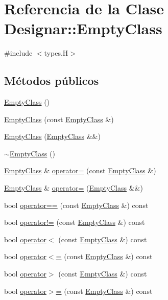 \hypertarget{class_designar_1_1_empty_class}{}\section{Referencia de la Clase Designar\+:\+:Empty\+Class}
\label{class_designar_1_1_empty_class}


{\ttfamily \#include $<$types.\+H$>$}

\subsection*{Métodos públicos}
\begin{DoxyCompactItemize}
\item 
\hyperlink{class_designar_1_1_empty_class_a88d846866a1e4872224ec2b4e750eba8}{Empty\+Class} ()
\item 
\hyperlink{class_designar_1_1_empty_class_a0a0b2cec90aebb02e6f5e3371087b221}{Empty\+Class} (const \hyperlink{class_designar_1_1_empty_class}{Empty\+Class} \&)
\item 
\hyperlink{class_designar_1_1_empty_class_aa18e6ee1ae08bc9500c9c0f91a6bae0c}{Empty\+Class} (\hyperlink{class_designar_1_1_empty_class}{Empty\+Class} \&\&)
\item 
\hyperlink{class_designar_1_1_empty_class_a751a2dca8e5df75e3f6a528f4fa43656}{$\sim$\+Empty\+Class} ()
\item 
\hyperlink{class_designar_1_1_empty_class}{Empty\+Class} \& \hyperlink{class_designar_1_1_empty_class_ac40f40d89e1823d95f5441e037d4212a}{operator=} (const \hyperlink{class_designar_1_1_empty_class}{Empty\+Class} \&)
\item 
\hyperlink{class_designar_1_1_empty_class}{Empty\+Class} \& \hyperlink{class_designar_1_1_empty_class_a41efe51c730deccac172173c27e4f9a7}{operator=} (\hyperlink{class_designar_1_1_empty_class}{Empty\+Class} \&\&)
\item 
bool \hyperlink{class_designar_1_1_empty_class_a377d66a49a2eaa853dcf5d798f82499e}{operator==} (const \hyperlink{class_designar_1_1_empty_class}{Empty\+Class} \&) const
\item 
bool \hyperlink{class_designar_1_1_empty_class_aafdaf95265007ed710e7b2393921d805}{operator!=} (const \hyperlink{class_designar_1_1_empty_class}{Empty\+Class} \&) const
\item 
bool \hyperlink{class_designar_1_1_empty_class_ae08a3c7c6b6d1d8bd73a52bf4f7be4fb}{operator$<$} (const \hyperlink{class_designar_1_1_empty_class}{Empty\+Class} \&) const
\item 
bool \hyperlink{class_designar_1_1_empty_class_a92e2e8f4d9b8d7ac7b6f2295242dd447}{operator$<$=} (const \hyperlink{class_designar_1_1_empty_class}{Empty\+Class} \&) const
\item 
bool \hyperlink{class_designar_1_1_empty_class_a2c58de7cc499842e2de8497c4892359b}{operator$>$} (const \hyperlink{class_designar_1_1_empty_class}{Empty\+Class} \&) const
\item 
bool \hyperlink{class_designar_1_1_empty_class_a84209f056d1930a130d55e8a6de090d2}{operator$>$=} (const \hyperlink{class_designar_1_1_empty_class}{Empty\+Class} \&) const
\end{DoxyCompactItemize}
